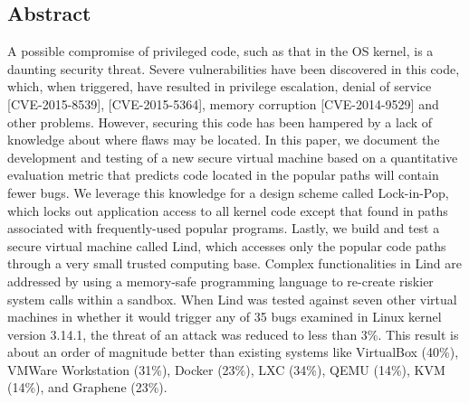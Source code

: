 \subsection*{Abstract}
A possible compromise of privileged code, such as that in the OS kernel, is a
daunting security threat. Severe vulnerabilities have been discovered in this
code, which, when triggered, have resulted in privilege escalation,
denial of service [CVE-2015-8539], [CVE-2015-5364], memory corruption
 [CVE-2014-9529] and other problems. However, securing this code has been hampered
  by a lack of knowledge about where flaws may be located. In this paper, we
 document the development and testing of a new secure virtual
 machine based on a quantitative evaluation metric that predicts code located
  in the popular paths will contain fewer bugs. We leverage this knowledge
  for a design scheme called  Lock-in-Pop, which locks out application access
 to all kernel code except that found in paths associated with frequently-used
 popular programs. Lastly, we build and test a secure virtual machine called Lind,
  which accesses only the popular code paths through a very small trusted computing
   base. Complex functionalities in Lind are addressed by using a memory-safe
    programming language to re-create riskier system calls within a sandbox.
  When Lind was tested against seven other virtual machines in whether it would
   trigger any of 35 bugs examined in Linux kernel version 3.14.1, the threat of
    an attack was reduced to less than 3\%. This result is about an order of
    magnitude better than existing systems like VirtualBox (40\%), VMWare Workstation
     (31\%), Docker (23\%), LXC (34\%), QEMU (14\%), KVM (14\%), and Graphene (23\%).
